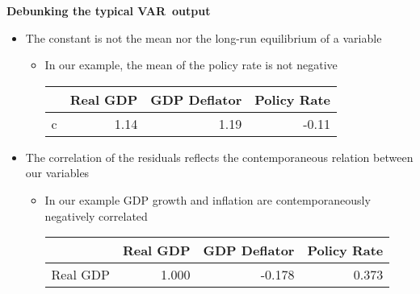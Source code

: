 \documentclass[10pt,handout]{beamer}
\begin{document}
\vspace{.1cm}

\begin{frame}
{\textbf{Debunking the typical VAR\ output}}

\begin{itemize}
\item The constant {{\color{red} is not}} the mean nor the long-run
equilibrium of a variable\pause

\begin{itemize}
\item In our example, the mean of the policy rate is not negative 
\begin{table}[tbph]
{\footnotesize \centering%
\begin{tabular}{lrrr}
\addlinespace\toprule & Real GDP & GDP Deflator & Policy Rate \\ 
\midrule c & 1.14 & 1.19 & -0.11%
\end{tabular}%
}
\end{table}
\medskip \pause
\end{itemize}

\item The correlation of the residuals reflects the {{\color{red}
contemporaneous} relation between our variables}\pause

\begin{itemize}
\item In our example GDP growth and inflation are contemporaneously
negatively correlated 
\begin{table}[tbph]
{\footnotesize \centering%
\begin{tabular}{lrrr}
\addlinespace\toprule & Real GDP & GDP Deflator & Policy Rate \\ 
\midrule Real GDP & 1.000 & -0.178 & 0.373%
\end{tabular}%
}
\end{table}
\end{itemize}
\end{itemize}
\end{frame}

\vspace{.1cm}
\end{document}
